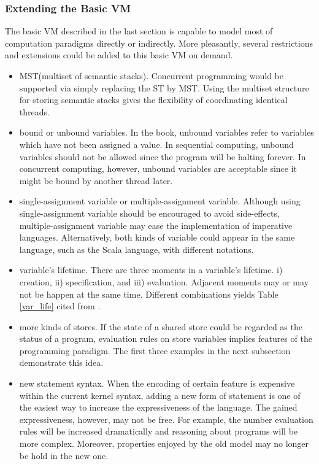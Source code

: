 \subsubsection{Extending the Basic VM}
\label{ex_vm}
The basic VM described in the last section is capable to model most of computation paradigms directly or indirectly.  More pleasantly, several restrictions and extensions could be added to this basic VM on demand.
\begin{itemize}
  \item MST(multiset of semantic stacks).  Concurrent programming would be supported via simply replacing the ST by MST.  Using the multiset structure for storing semantic stacks gives the flexibility of coordinating identical threads.
  \item bound or unbound variables.   In the book, unbound variables refer to variables which have not been assigned a value.  In sequential computing, unbound variables should not be allowed since the program will be halting forever.  In concurrent computing, however, unbound variables are acceptable since it might be bound by another thread later.
  \item single-assignment variable or multiple-assignment variable.  Although using single-assignment variable should be encouraged to avoid side-effects, multiple-assignment variable may ease the implementation of imperative languages.  Alternatively, both kinds of variable could appear in the same language, such as the Scala language, with different notations.
  \item variable’s lifetime.  There are three moments in a variable’s lifetime. i) creation, ii) specification, and iii) evaluation.  Adjacent moments may or may not be happen at the same time.  Different combinations yields Table \ref{var_life} cited from \cite{roy}.
  \item more kinds of stores.  If the state of a shared store could be regarded as the status of a program, evaluation rules on store variables implies features of the programming paradigm.  The first three examples in the next subsection demonstrate this idea.
  \item new statement syntax.  When the encoding  of certain feature is expensive within the current kernel syntax, adding a new form of statement is one of the easiest way to increase the expressiveness of the language.  The gained expressiveness, however, may not be free.  For example, the number evaluation rules will be increased dramatically and reasoning about programs will be more complex.  Moreover, properties enjoyed by the old model may no longer be hold in the new one.
\end{itemize}

